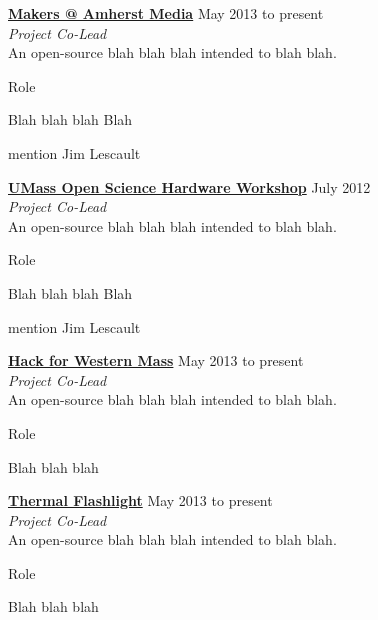 \documentclass[10pt]{article}
\newcommand{\halfblankline}{\quad\vspace{-0.5\baselineskip}\pagebreak[3]}
\begin{document}
\href{http://open-eie.io}{\textbf{Makers @ Amherst Media}} \hfill {May 2013 to present} \\
\emph{Project Co-Lead} \\
An open-source blah blah blah intended to blah blah.
    \begin{innerlist}
        \item Role
        \item Blah blah blah Blah 
        \item mention Jim Lescault
\end{innerlist}

\halfblankline

\href{http://open-eie.io}{\textbf{UMass Open Science Hardware Workshop}} \hfill {July 2012} \\
\emph{Project Co-Lead} \\
An open-source blah blah blah intended to blah blah.
    \begin{innerlist}
        \item Role
        \item Blah blah blah Blah 
        \item mention Jim Lescault
\end{innerlist}

\halfblankline


\href{http://openwaterproject.io}{\textbf{Hack for Western Mass}} \hfill {May 2013 to present} \\
\emph{Project Co-Lead} \\
An open-source blah blah blah intended to blah blah.
    \begin{innerlist}
        \item Role
        \item Blah blah blah 

\end{innerlist}

\halfblankline

\href{http://openwaterproject.io}{\textbf{Thermal Flashlight}} \hfill {May 2013 to present} \\
\emph{Project Co-Lead} \\
An open-source blah blah blah intended to blah blah.
    \begin{innerlist}
        \item Role
        \item Blah blah blah 

\end{innerlist}

\halfblankline
\end{document}
